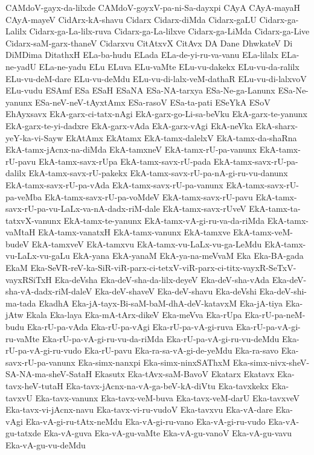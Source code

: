 {CAMdoV-gayx-da-lilxde
CAMdoV-goyxV-pa-ni-Sa-dayxpi
CAyA
CAyA-mayaH
CAyA-mayeV
CidArx-kA-shavu
Cidarx
Cidarx-diMda
Cidarx-gaLU
Cidarx-ga-Lalilx
Cidarx-ga-La-lilx-ruva
Cidarx-ga-La-lilxve
Cidarx-ga-LiMda
Cidarx-ga-Live
Cidarx-saM-garx-thaneV
Cidarxvu
CitAtxvX
CitAvx
DA
Dane
DhwkateV
Di
DiMDima
DitathxH
ELa-ba-hudu
ELada
ELa-de-yi-ru-va-vanu
ELa-lilalx
ELa-ne-yadU
ELa-ne-yadu
ELu
ELuva
ELu-vaMte
ELu-vu-dakekx
ELu-vu-da-ralilx
ELu-vu-deM-dare
ELu-vu-deMdu
ELu-vu-di-lalx-veM-dathaR
ELu-vu-di-lalxvoV
ELu-vudu
ESAmf
ESa
ESaH
ESaNA
ESa-NA-tarxya
ESa-Ne-ga-Lanunx
ESa-Ne-yanunx
ESa-neV-neV-tAyxtAmx
ESa-rasoV
ESa-ta-pati
ESeYkA
ESoV
EhAyxsavx
EkA-garx-ci-tatx-nAgi
EkA-garx-go-Li-sa-beVku
EkA-garx-te-yanunx
EkA-garx-te-yi-dadxre
EkA-garx-vAda
EkA-garx-vAgi
EkA-neVka
EkA-sharx-yeY-ka-vi-Sayw
EkAtAmx
EkAtamx
EkA-tamx-dalelxV
EkA-tamx-da-shaRna
EkA-tamx-jAcnx-na-diMda
EkA-tamxneV
EkA-tamx-rU-pa-vanunx
EkA-tamx-rU-pavu
EkA-tamx-savx-rUpa
EkA-tamx-savx-rU-pada
EkA-tamx-savx-rU-pa-dalilx
EkA-tamx-savx-rU-pakekx
EkA-tamx-savx-rU-pa-nA-gi-ru-vu-danunx
EkA-tamx-savx-rU-pa-vAda
EkA-tamx-savx-rU-pa-vanunx
EkA-tamx-savx-rU-pa-veMba
EkA-tamx-savx-rU-pa-voMdeV
EkA-tamx-savx-rU-pavu
EkA-tamx-savx-rU-pa-vu-LaLx-va-nA-dadx-riM-dale
EkA-tamx-savx-rUveV
EkA-tamx-ta-tatxvX-vanunx
EkA-tamx-te-yanunx
EkA-tamx-vA-gi-ru-va-da-riMda
EkA-tamx-vaMtaH
EkA-tamx-vanatxH
EkA-tamx-vanunx
EkA-tamxve
EkA-tamx-veM-budeV
EkA-tamxveV
EkA-tamxvu
EkA-tamx-vu-LaLx-vu-ga-LeMdu
EkA-tamx-vu-LaLx-vu-gaLu
EkA-yana
EkA-yanaM
EkA-ya-na-meVvaM
Eka
Eka-BA-gada
EkaM
Eka-SeVR-reV-ka-SiR-viR-parx-ci-tetxV-viR-parx-ci-titx-vayxR-SeTxV-vayxRSiTxH
Eka-deVsha
Eka-deV-sha-da-lilx-deyeV
Eka-deV-sha-vAda
Eka-deV-sha-vA-dadx-riM-daleV
Eka-deV-shaveV
Eka-deV-shavu
Eka-deVshi
Eka-deV-shi-ma-tada
EkadhA
Eka-jA-tayx-Bi-saM-baM-dhA-deV-katavxM
Eka-jA-tiya
Eka-jAtw
Ekala
Eka-laya
Eka-mA-tArx-dikeV
Eka-meVva
Eka-rUpa
Eka-rU-pa-neM-budu
Eka-rU-pa-vAda
Eka-rU-pa-vAgi
Eka-rU-pa-vA-gi-ruva
Eka-rU-pa-vA-gi-ru-vaMte
Eka-rU-pa-vA-gi-ru-vu-da-riMda
Eka-rU-pa-vA-gi-ru-vu-deMdu
Eka-rU-pa-vA-gi-ru-vudo
Eka-rU-pavu
Eka-ra-sa-vA-gi-de-yeMdu
Eka-ra-savo
Eka-savx-rU-pa-vanunx
Eka-simx-nanxpi
Eka-simx-ninxSAThxM
Eka-simx-nivx-sheV-SA-NA-ma-sheV-SataH
Ekasutx
Eka-tAvx-saM-BavoV
Ekatarx
Ekatavx
Eka-tavx-heV-tutaH
Eka-tavx-jAcnx-na-vA-ga-beV-kA-diVtu
Eka-tavxkekx
Eka-tavxvU
Eka-tavx-vanunx
Eka-tavx-veM-buva
Eka-tavx-veM-darU
Eka-tavxveV
Eka-tavx-vi-jAcnx-navu
Eka-tavx-vi-ru-vudoV
Eka-tavxvu
Eka-vA-dare
Eka-vAgi
Eka-vA-gi-ru-tAtx-neMdu
Eka-vA-gi-ru-vano
Eka-vA-gi-ru-vudo
Eka-vA-gu-tatxde
Eka-vA-guva
Eka-vA-gu-vaMte
Eka-vA-gu-vanoV
Eka-vA-gu-vavu
Eka-vA-gu-vu-deMdu
}
